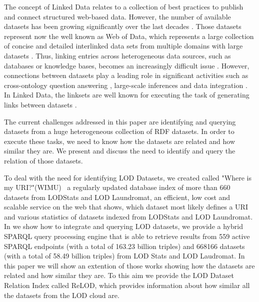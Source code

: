 \documentclass[sw]{iosart2x}
\begin{document}

The concept of Linked Data relates to a collection of best practices to publish and connect structured web-based data.
However, the number of available datasets has been growing significantly over the last decades \cite{bizer2011linked}.
Those datasets represent now the well known as Web of Data, which represents a large collection of concise and detailed interlinked data sets from multiple domains with large datasets \cite{saleem2013linked}.
Thus, linking entries across heterogeneous data sources, such as databases or knowledge bases, becomes an increasingly difficult issue \cite{valdestilhas2017high, NGAU11, saeedi2018scalable}.
However, connections between datasets play a leading role in significant activities such as cross-ontology question answering \cite{lopez2009cross}, large-scale inferences \cite{urbani2010owl} and data integration \cite{rahm2016case}.
In Linked Data, the linksets are well known for executing the task of generating links between datasets \cite{NGAU11}.

The current challenges addressed in this paper are identifying and querying datasets from a huge heterogeneous collection of RDF datasets.
In order to execute these tasks, we need to know how the datasets are related and how similar they are.
We present and discuss the need to identify and query the relation of those datasets.

To deal with the need for identifying LOD Datasets, we created called "Where is my URI?"(WIMU)~\cite{valdestilhas2018my} a regularly updated database index of more than \SI{660}{\kilo\nothing} datasets from LODStats and LOD Laundromat, an efficient, low cost and scalable service on the web that shows, which dataset most likely defines a URI and various statistics of datasets indexed from LODStats and LOD Laundromat.
In \cite{valdestilhas2019more} we show how to integrate and querying LOD datasets, we provide a hybrid SPARQL query processing engine that is able to retrieve results from 559 active SPARQL endpoints (with a total of 163.23 billion triples) and \num{668166} datasets (with a total of 58.49 billion triples) from LOD Stats and LOD Laudromat.
In this paper we will show an extention of those works\cite{valdestilhas2018my, valdestilhas2019more} showing how the datasets are related and how similar they are.
To this aim we provide the LOD Dataset Relation Index called ReLOD, which provides information about how similar all the datasets from the LOD cloud are.%
\end{document}
